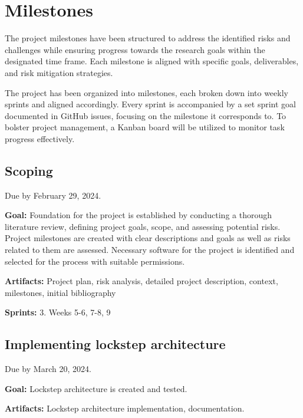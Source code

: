 \chapter{Milestones}

The project milestones have been structured to address the identified risks and challenges while ensuring progress towards the research goals within the designated time frame. Each milestone is aligned with specific goals, deliverables, and risk mitigation strategies.

The project has been organized into milestones, each broken down into weekly sprints and aligned accordingly. Every sprint is accompanied by a set sprint goal documented in GitHub issues, focusing on the milestone it corresponds to. To bolster project management, a Kanban board will be utilized to monitor task progress effectively.

\section{Scoping}

Due by February 29, 2024.\newline

\noindent\textbf{Goal:} Foundation for the project is established by conducting a thorough literature review, defining project goals, scope, and assessing potential risks. Project milestones are created with clear descriptions and goals as well as risks related to them are assessed. Necessary software for the project is identified and selected for the process with suitable permissions.\newline

\noindent\textbf{Artifacts:} Project plan, risk analysis, detailed project description, context, milestones, initial bibliography\newline

\noindent\textbf{Sprints:} 3. Weeks 5-6, 7-8, 9\newline

\section{Implementing lockstep architecture}

Due by March 20, 2024.\newline

\noindent\textbf{Goal:} Lockstep architecture is created and tested. \newline

\noindent\textbf{Artifacts:} Lockstep architecture implementation, documentation. \newline

